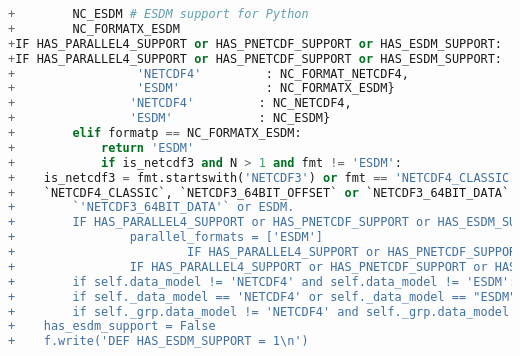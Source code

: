 \begin{lstlisting}[language=python,upquote=true]
+        NC_ESDM # ESDM support for Python
+        NC_FORMATX_ESDM
+IF HAS_PARALLEL4_SUPPORT or HAS_PNETCDF_SUPPORT or HAS_ESDM_SUPPORT:
+IF HAS_PARALLEL4_SUPPORT or HAS_PNETCDF_SUPPORT or HAS_ESDM_SUPPORT:
+                 'NETCDF4'         : NC_FORMAT_NETCDF4,
+                 'ESDM'            : NC_FORMATX_ESDM}
+                'NETCDF4'         : NC_NETCDF4,
+                'ESDM'            : NC_ESDM}
+        elif formatp == NC_FORMATX_ESDM:
+            return 'ESDM'
+            if is_netcdf3 and N > 1 and fmt != 'ESDM':
+    is_netcdf3 = fmt.startswith('NETCDF3') or fmt == 'NETCDF4_CLASSIC' or fmt == 'ESDM'
+    `NETCDF4_CLASSIC`, `NETCDF3_64BIT_OFFSET` or `NETCDF3_64BIT_DATA` or ESDM."""
+        `'NETCDF3_64BIT_DATA'` or ESDM.
+        IF HAS_PARALLEL4_SUPPORT or HAS_PNETCDF_SUPPORT or HAS_ESDM_SUPPORT:
+                parallel_formats = ['ESDM']
+                        IF HAS_PARALLEL4_SUPPORT or HAS_PNETCDF_SUPPORT or HAS_ESDM_SUPPORT:
+                IF HAS_PARALLEL4_SUPPORT or HAS_PNETCDF_SUPPORT or HAS_ESDM_SUPPORT:
+        if self.data_model != 'NETCDF4' and self.data_model != 'ESDM':
+        if self._data_model == 'NETCDF4' or self._data_model == "ESDM":
+        if self._grp.data_model != 'NETCDF4' and self._grp.data_model != 'ESDM':
+    has_esdm_support = False
+    f.write('DEF HAS_ESDM_SUPPORT = 1\n')
\end{lstlisting}

